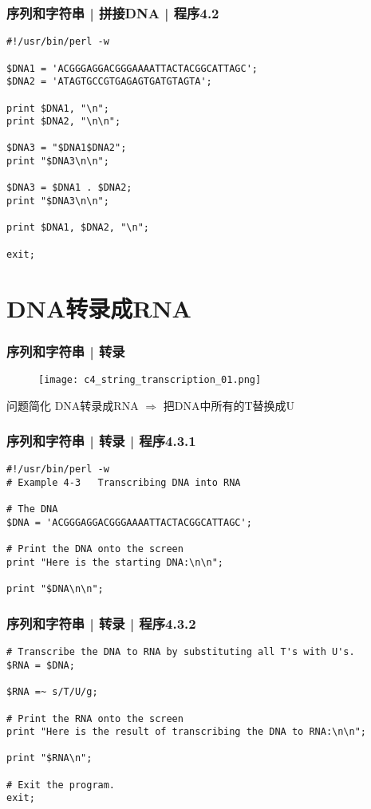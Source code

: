\begin{frame}[fragile]
  \frametitle{序列和字符串 | 拼接DNA | \alert{程序4.2}}
  \vspace{-1.5em}
\begin{lstlisting}[basicstyle=\small\tt]
#!/usr/bin/perl -w

$DNA1 = 'ACGGGAGGACGGGAAAATTACTACGGCATTAGC';
$DNA2 = 'ATAGTGCCGTGAGAGTGATGTAGTA';

print $DNA1, "\n";
print $DNA2, "\n\n";

$DNA3 = "$DNA1$DNA2";
print "$DNA3\n\n";

$DNA3 = $DNA1 . $DNA2;
print "$DNA3\n\n";

print $DNA1, $DNA2, "\n";

exit;
\end{lstlisting}
\end{frame}

\section{DNA转录成RNA}
\begin{frame}
  \frametitle{序列和字符串 | 转录}
  \begin{figure}
    \centering
    \texttt{[image: c4\_string\_transcription\_01.png]}
  \end{figure}
  \pause
  \begin{block}{问题简化}
    DNA转录成RNA $\Longrightarrow$ 把DNA中所有的T替换成U
  \end{block}
\end{frame}

\begin{frame}[fragile,label=exam4.3.1]
  \frametitle{序列和字符串 | 转录 | 程序4.3.1}
  \vspace{-1.5em}
\begin{lstlisting}
#!/usr/bin/perl -w
# Example 4-3   Transcribing DNA into RNA

# The DNA
$DNA = 'ACGGGAGGACGGGAAAATTACTACGGCATTAGC';

# Print the DNA onto the screen
print "Here is the starting DNA:\n\n";

print "$DNA\n\n";
\end{lstlisting}
\end{frame}

\begin{frame}[fragile,label=exam4.3.2]
  \frametitle{序列和字符串 | 转录 | 程序4.3.2}
  \vspace{-1.5em}
\begin{lstlisting}[firstnumber=12]
# Transcribe the DNA to RNA by substituting all T's with U's.
$RNA = $DNA;

$RNA =~ s/T/U/g;

# Print the RNA onto the screen
print "Here is the result of transcribing the DNA to RNA:\n\n";

print "$RNA\n";

# Exit the program.
exit;
\end{lstlisting}
\end{frame}

